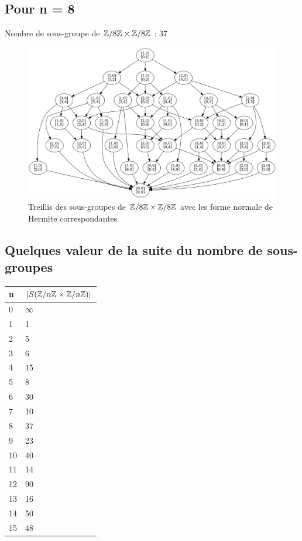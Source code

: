 \documentclass[12pt]{article}
\begin{document}
\subsection{Pour n = 8}
\noindent
Nombre de sous-groupe de $\mathbb Z/8\mathbb Z \times \mathbb Z/8\mathbb Z$ : 37
\begin{figure}[!h]
	\centering
	\includegraphics[scale=0.3]{Z8ZxZ8Z.png}
	\caption{
		Treillis des sous-groupes de $\mathbb Z/8\mathbb Z \times \mathbb Z/8\mathbb Z$ avec les forme normale de Hermite
		correspondantes
	}
\end{figure}

\subsection{Quelques valeur de la suite du nombre de sous-groupes}
\begin{center}
	\begin{tabular}{|l | l|}
		\hline
		n  & $|S(\mathbb Z/n\mathbb Z \times \mathbb Z/n\mathbb Z)|$ \tabularnewline
		\hline
		0  & $\infty$ \tabularnewline
		1  & 1 \tabularnewline
		2  & 5 \tabularnewline
		3  & 6\tabularnewline
		4  & 15 \tabularnewline
		5  & 8\tabularnewline
		6  & 30 \tabularnewline
		7  & 10 \tabularnewline
		8  & 37 \tabularnewline
		9  & 23 \tabularnewline
		10 & 40 \tabularnewline
		11 & 14 \tabularnewline
		12 & 90 \tabularnewline
		13 & 16 \tabularnewline
		14 & 50 \tabularnewline
		15 & 48 \tabularnewline
		\hline
	\end{tabular}

\end{center}

\newpage
\end{document}
